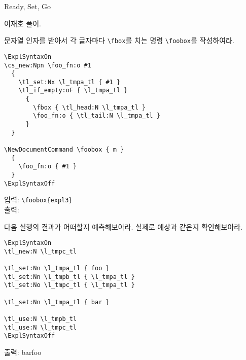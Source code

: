 \documentclass[a4paper,amsmath,itemph]{oblivoir}
\begin{document}
\begin{intro}[2]
  Ready, Set, Go
\end{intro}

이재호 풀이.

\medskip

\begin{tcolorbox}[title={문제 1},fonttitle=\sffamily\bfseries]
  문자열 인자를 받아서 각 글자마다 \verb|\fbox|를 치는 명령 \verb|\foobox|를
  작성하여라.

  \tcblower

  \begin{verbatim}
\ExplSyntaxOn
\cs_new:Npn \foo_fn:o #1
  {
    \tl_set:Nx \l_tmpa_tl { #1 }
    \tl_if_empty:oF { \l_tmpa_tl }
      {
        \fbox { \tl_head:N \l_tmpa_tl }
        \foo_fn:o { \tl_tail:N \l_tmpa_tl }
      }
  }

\NewDocumentCommand \foobox { m }
  {
    \foo_fn:o { #1 }
  }
\ExplSyntaxOff
  \end{verbatim}

  \begin{tcolorbox}{}
    입력: \verb|\foobox{expl3}|\\
    출력: 
  \end{tcolorbox}

\end{tcolorbox}


\begin{tcolorbox}[title={문제 3},fonttitle=\sffamily\bfseries]
  다음 실행의 결과가 어떠할지 예측해보아라.
  실제로 예상과 같은지 확인해보아라.

  \tcblower

  \begin{verbatim}
\ExplSyntaxOn
\tl_new:N \l_tmpc_tl

\tl_set:Nn \l_tmpa_tl { foo }
\tl_set:Nn \l_tmpb_tl { \l_tmpa_tl }
\tl_set:No \l_tmpc_tl { \l_tmpa_tl }

\tl_set:Nn \l_tmpa_tl { bar }

\tl_use:N \l_tmpb_tl
\tl_use:N \l_tmpc_tl
\ExplSyntaxOff
  \end{verbatim}

  \begin{tcolorbox}{}
    출력: barfoo
  \end{tcolorbox}

\end{tcolorbox}
\end{document}
